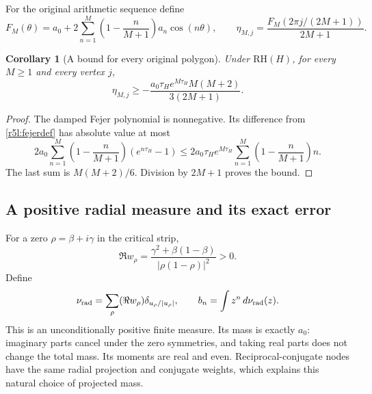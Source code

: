 \documentclass[11pt,a4paper]{article}
\newtheorem{corollary}[theorem]{Corollary}
\theoremstyle{definition}\newtheorem{definition}[theorem]{Definition}
\theoremstyle{remark}\newtheorem{remark}[theorem]{Remark}
\numberwithin{equation}{section}
\begin{document}
For the original arithmetic sequence define
\begin{equation}\label{r5l:fejerdef}
 F_M(\theta)=a_0+2\sum_{n=1}^M
    \left(1-\frac n{M+1}\right)a_n\cos(n\theta),
 \qquad
 \eta_{M,j}=\frac{F_M(2\pi j/(2M+1))}{2M+1}.
\end{equation}
\begin{corollary}[A bound for every original polygon]
\label{r5l:polygondeficit}
Under $\mathrm{RH}(H)$, for every $M\ge1$ and every vertex $j$,
\begin{equation}\label{r5l:polygondeficiteq}
 \eta_{M,j}\ge
 -\frac{a_0\tau_He^{M\tau_H}M(M+2)}{3(2M+1)}.
\end{equation}
\end{corollary}
\begin{proof}
The damped Fejer polynomial is nonnegative.  Its difference from
\eqref{r5l:fejerdef} has absolute value at most
\[
 2a_0\sum_{n=1}^M\left(1-\frac n{M+1}\right)
       (e^{n\tau_H}-1)
 \le2a_0\tau_He^{M\tau_H}
       \sum_{n=1}^M\left(1-\frac n{M+1}\right)n.
\]
The last sum is $M(M+2)/6$.  Division by $2M+1$ proves the bound.
\end{proof}

\subsection{A positive radial measure and its exact error}

For a zero $\rho=\beta+i\gamma$ in the critical strip,
\begin{equation}\label{r5l:positiveweights}
 \Re w_\rho=
 \frac{\gamma^2+\beta(1-\beta)}{|\rho(1-\rho)|^2}>0.
\end{equation}
Define
\begin{equation}\label{r5l:radialmeasure}
 \nu_{\rm rad}=\sum_\rho(\Re w_\rho)
                     \delta_{u_\rho/|u_\rho|},
 \qquad b_n=\int z^n\,d\nu_{\rm rad}(z).
\end{equation}
This is an unconditionally positive finite measure.  Its mass is
exactly $a_0$: imaginary parts cancel under the zero symmetries,
and taking real parts does not change the total mass.  Its moments
are real and even.  Reciprocal-conjugate nodes have the same radial
projection and conjugate weights, which explains this natural
choice of projected mass.
\end{document}
